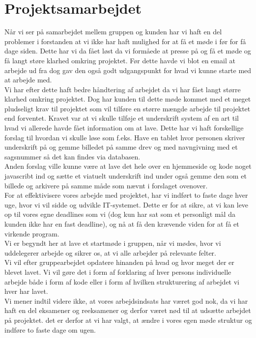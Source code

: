 \documentclass[a4paper]{article}
\begin{document}
\section{Projektsamarbejdet}
Når vi ser på samarbejdet mellem gruppen og kunden har vi haft en del problemer i forstanden at vi ikke har haft mulighed for at få et møde i før for få dage siden. Dette har vi da fået løst da vi formåede at presse på og få et møde og få langt støre klarhed omkring projektet. Før dette havde vi blot en email at arbejde ud fra dog gav den også godt udgangspunkt for hvad vi kunne starte med at arbejde med.\\
Vi har efter dette haft bedre håndtering af arbejdet da vi har fået langt større klarhed omkring projektet. Dog har kunden til dette møde kommet med et meget pludseligt krav til projektet som vil tilføre en større mængde arbejde til projektet end forventet. Kravet var at vi skulle tilføje et underskrift system af en art til hvad vi allerede havde fået information om at lave. Dette har vi haft forskellige forslag til hvordan vi skulle løse som f.eks. Have en tablet hvor personen skriver underskrift på og gemme billedet på samme drev og med navngivning med et sagsnummer så det kan findes via databasen.\\
Anden forslag ville kunne være at lave det hele over en hjemmeside og kode noget javascribt ind og sætte et viatuelt underskrift ind under også gemme den som et billede og arkivere på samme måde som nævnt i forslaget ovenover.\\
For at effektivisere vores arbejde med projektet, har vi indført to faste dage hver uge, hvor vi vil sidde og udvikle IT-systemet. Dette er for at sikre, at vi kan leve op til vores egne deadlines som vi (dog kun har sat som et personligt mål da kunden ikke har en fast deadline), og nå at få den krævende viden for at få et virkende program.\\
Vi er begyndt her at lave et startmøde i gruppen, når vi mødes, hvor vi uddelegerer arbejde og sikrer os, at vi alle arbejder på relevante felter.\\
Vi vil efter gruppearbejdet opdatere hinanden på hvad og hvor meget der er blevet lavet. Vi vil gøre det i form af forklaring af hver persons individuelle arbejde både i form af kode eller i form af hvilken strukturering af arbejdet vi hver har lavet.\\
Vi mener indtil videre ikke, at vores arbejdsindsats har været god nok, da vi har haft en del eksamener og reeksamener og derfor været nød til at udsætte arbejdet på projektet. det er derfor at vi har valgt, at ændre i vores egen møde struktur og indføre to faste dage om ugen.
\newpage
\end{document}

